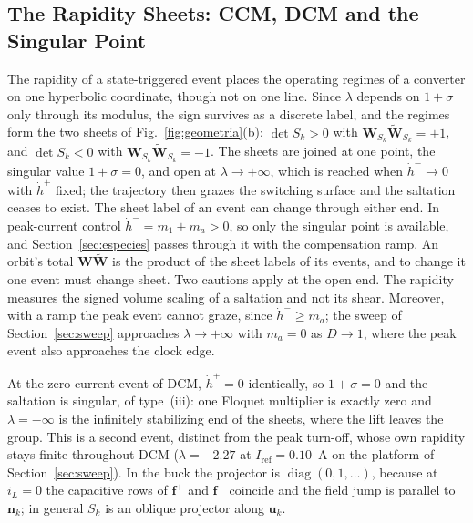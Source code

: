 \documentclass[journal]{IEEEtran}
\newcommand{\rev}[1]{\widetilde{#1}}
\begin{document}
\subsection{The Rapidity Sheets: CCM, DCM and the Singular Point}
\label{sec:sheets}
The rapidity of a state-triggered event places the operating regimes of a
converter on one hyperbolic coordinate, though not on one line. Since
$\lambda$ depends on $1+\sigma$ only through its modulus, the sign survives
as a discrete label, and the regimes form the two sheets of
Fig.~\ref{fig:geometria}(b): $\det S_k>0$ with
$\bm{W}_{S_k}\rev{\bm{W}}_{S_k}=+1$, and $\det S_k<0$ with
$\bm{W}_{S_k}\rev{\bm{W}}_{S_k}=-1$. The sheets are joined at one point, the
singular value $1+\sigma=0$, and open at $\lambda\to+\infty$, which is
reached when $\dot h^{-}\to0$ with $\dot h^{+}$ fixed; the trajectory then
grazes the switching surface and the saltation ceases to exist. The sheet
label of an event can change through either end. In peak-current control
$\dot h^{-}=m_1+m_a>0$, so only the singular point is available, and
Section~\ref{sec:especies} passes through it with the compensation ramp. An
orbit's total $\bm{W}\rev{\bm{W}}$ is the product of the sheet labels of its
events, and to change it one event must change sheet. Two cautions apply at
the open end. The rapidity measures the signed volume scaling of a saltation
and not its shear. Moreover, with a ramp the peak event cannot graze, since
$\dot h^{-}\geq m_a$; the sweep of Section~\ref{sec:sweep} approaches
$\lambda\to+\infty$ with $m_a=0$ as $D\to1$, where the peak event also
approaches the clock edge.

At the zero-current event of DCM, $\dot h^{+}=0$ identically, so $1+\sigma=0$
and the saltation is singular, of type~(iii): one Floquet multiplier is
exactly zero and $\lambda=-\infty$ is the infinitely stabilizing end of the
sheets, where the lift leaves the group. This is a second event, distinct
from the peak turn-off, whose own rapidity stays finite throughout DCM
($\lambda=-2.27$ at $I_{\mathrm{ref}}=0.10$~A on the platform of
Section~\ref{sec:sweep}). In the buck the projector is
$\operatorname{diag}(0,1,\dots)$, because at $i_L=0$ the capacitive rows of
$\bm{f}^{+}$ and $\bm{f}^{-}$ coincide and the field jump is parallel to
$\bm{n}_k$; in general $S_k$ is an oblique projector along $\bm{u}_k$.
\end{document}
